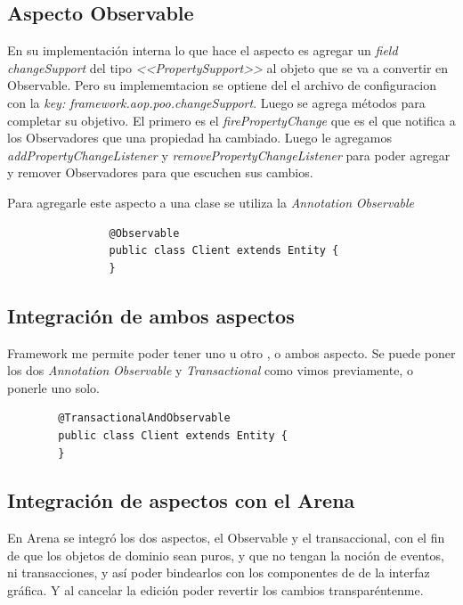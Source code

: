 	\subsection{ Aspecto Observable}
			
		En su implementación interna lo que hace el aspecto es agregar un \emph{field
		changeSupport} del tipo \emph{<<PropertySupport>>} al objeto que se va a
		convertir en Observable. Pero su implememtacion se optiene del el archivo de
		configuracion con la \emph{key: framework.aop.poo.changeSupport}.
		Luego se agrega métodos para completar su objetivo.
		El primero es el \emph{firePropertyChange} que es el que notifica a los
		Observadores que una propiedad ha cambiado.	Luego le agregamos
		\emph{addPropertyChangeListener} y \emph{removePropertyChangeListener} para
		poder agregar y remover Observadores para que escuchen sus cambios.
		
		Para agregarle este aspecto a una clase se utiliza la \emph{Annotation}
		\emph{Observable}
		
			\begin{lstlisting} 
				@Observable
				public class Client extends Entity {
				}
			\end{lstlisting}
		


\subsection{Integración de ambos aspectos } 
	Framework me permite poder tener uno u otro , o
	ambos aspecto. Se puede poner los dos \emph{Annotation} \emph{Observable} y
	\emph{Transactional} como vimos previamente, o ponerle uno solo. 
	
	\begin{lstlisting} 
		@TransactionalAndObservable
		public class Client extends Entity {
		}
	\end{lstlisting}
	
	
	
\subsection{Integración de aspectos con el Arena}
	En Arena se integró los dos aspectos, el Observable y el transaccional, con el
	fin de que los objetos de dominio sean puros, y que no tengan la noción de
	eventos, ni transacciones, y así poder bindearlos con los componentes de de la
	interfaz gráfica. Y al cancelar la edición poder revertir los cambios
	transparéntenme.
	
